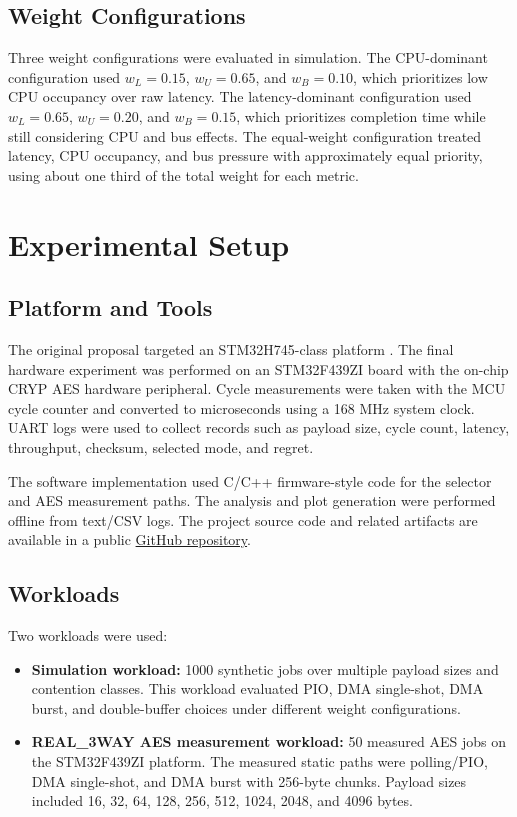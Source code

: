 \documentclass[conference]{IEEEtran}
\begin{document}
\subsection{Weight Configurations}
Three weight configurations were evaluated in simulation. The CPU-dominant configuration used $w_L=0.15$, $w_U=0.65$, and $w_B=0.10$, which prioritizes low CPU occupancy over raw latency. The latency-dominant configuration used $w_L=0.65$, $w_U=0.20$, and $w_B=0.15$, which prioritizes completion time while still considering CPU and bus effects. The equal-weight configuration treated latency, CPU occupancy, and bus pressure with approximately equal priority, using about one third of the total weight for each metric.

\section{Experimental Setup}
\subsection{Platform and Tools}
The original proposal targeted an STM32H745-class platform \cite{stm32h745}. The final hardware experiment was performed on an STM32F439ZI board with the on-chip CRYP AES hardware peripheral. Cycle measurements were taken with the MCU cycle counter and converted to microseconds using a 168 MHz system clock. UART logs were used to collect records such as payload size, cycle count, latency, throughput, checksum, selected mode, and regret.

The software implementation used C/C++ firmware-style code for the selector and AES measurement paths. The analysis and plot generation were performed offline from text/CSV logs. The project source code and related artifacts are available in a public \href{https://github.com/egekarakaya/CMP720-Data-Movement-Strategy-Selection-for-AES-ECDSA-Accelerator-Workloads-on-an-STM32H7-Series-MCU}{GitHub repository}.

\subsection{Workloads}
Two workloads were used:
\begin{itemize}
    \item \textbf{Simulation workload:} 1000 synthetic jobs over multiple payload sizes and contention classes. This workload evaluated PIO, DMA single-shot, DMA burst, and double-buffer choices under different weight configurations.
    \item \textbf{REAL\_3WAY AES measurement workload:} 50 measured AES jobs on the STM32F439ZI platform. The measured static paths were polling/PIO, DMA single-shot, and DMA burst with 256-byte chunks. Payload sizes included 16, 32, 64, 128, 256, 512, 1024, 2048, and 4096 bytes.
\end{itemize}
\end{document}
